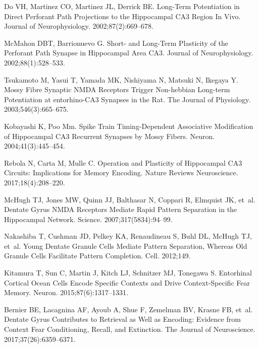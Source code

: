 \documentclass[10pt,letterpaper]{article}
\begin{document}
\begin{thebibliography}{10}
  Do VH, Martinez CO, Martinez JL, Derrick BE.
  \newblock Long-{{Term Potentiation}} in {{Direct Perforant Path Projections}}
    to the {{Hippocampal CA3 Region In Vivo}}.
  \newblock Journal of Neurophysiology. 2002;87(2):669--678.
  
  McMahon DBT, Barrionuevo G.
  \newblock Short- and {{Long-Term Plasticity}} of the {{Perforant Path Synapse}}
    in {{Hippocampal Area CA3}}.
  \newblock Journal of Neurophysiology. 2002;88(1):528--533.
  
  Tsukamoto M, Yasui T, Yamada MK, Nishiyama N, Matsuki N, Ikegaya Y.
  \newblock Mossy Fibre Synaptic {{NMDA}} Receptors Trigger Non-hebbian Long-term
    Potentiation at entorhino-{{CA3}} Synapses in the Rat.
  \newblock The Journal of Physiology. 2003;546(3):665--675.
  
  Kobayashi K, Poo Mm.
  \newblock Spike {{Train Timing-Dependent Associative Modification}} of
    {{Hippocampal CA3 Recurrent Synapses}} by {{Mossy Fibers}}.
  \newblock Neuron. 2004;41(3):445--454.
  
  Rebola N, Carta M, Mulle C.
  \newblock Operation and Plasticity of Hippocampal {{CA3}} Circuits:
    Implications for Memory Encoding.
  \newblock Nature Reviews Neuroscience. 2017;18(4):208--220.
  
  McHugh TJ, Jones MW, Quinn JJ, Balthasar N, Coppari R, Elmquist JK, et~al.
  \newblock Dentate Gyrus {{NMDA}} Receptors Mediate Rapid Pattern Separation in
    the Hippocampal Network.
  \newblock Science. 2007;317(5834):94--99.
  
  Nakashiba T, Cushman JD, Pelkey KA, Renaudineau S, Buhl DL, McHugh TJ, et~al.
  \newblock Young Dentate Granule Cells Mediate Pattern Separation, Whereas Old
    Granule Cells Facilitate Pattern Completion.
  \newblock Cell. 2012;149.
  
  Kitamura T, Sun C, Martin J, Kitch LJ, Schnitzer MJ, Tonegawa S.
  \newblock Entorhinal {{Cortical Ocean Cells Encode Specific Contexts}} and
    {{Drive Context-Specific Fear Memory}}.
  \newblock Neuron. 2015;87(6):1317--1331.
  
  Bernier BE, Lacagnina AF, Ayoub A, Shue F, Zemelman BV, Krasne FB, et~al.
  \newblock Dentate {{Gyrus Contributes}} to {{Retrieval}} as Well as
    {{Encoding}}: {{Evidence}} from {{Context Fear Conditioning}}, {{Recall}},
    and {{Extinction}}.
  \newblock The Journal of Neuroscience. 2017;37(26):6359--6371.
  

\end{thebibliography}
\end{document}
